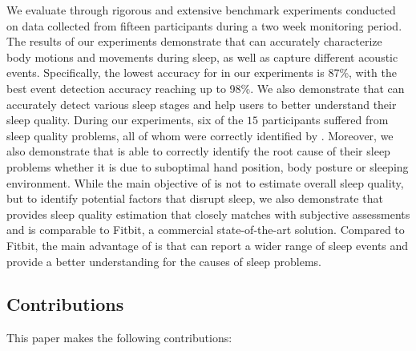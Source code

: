 
We evaluate \systemname through rigorous and extensive benchmark experiments conducted on data collected from fifteen participants during a
two week monitoring period. The results of our experiments demonstrate that \systemname can accurately characterize body motions and
movements during sleep, as well as capture different acoustic events. Specifically, the lowest accuracy for \systemname in our experiments
is 87\%, with the best event detection accuracy reaching up to 98\%. We also demonstrate
that \systemname can accurately detect various sleep stages and help users to better understand their sleep quality. During our experiments, six of the $15$ participants suffered from sleep quality problems, all of whom were correctly identified by \systemname. Moreover, we also demonstrate that \systemname is able to correctly identify the root cause of their sleep problems whether it is due to suboptimal hand position, body posture or sleeping environment. While the main objective of \systemname is not to estimate overall sleep quality, but to identify potential factors that disrupt sleep, we also demonstrate that \systemname provides sleep quality estimation that closely matches with subjective assessments and is comparable to Fitbit, a commercial state-of-the-art solution. Compared to Fitbit, the main advantage of \systemname is that can report a wider range of sleep events and provide a better understanding for the causes of sleep problems. %


\subsection*{Contributions}
This paper makes the following contributions:

